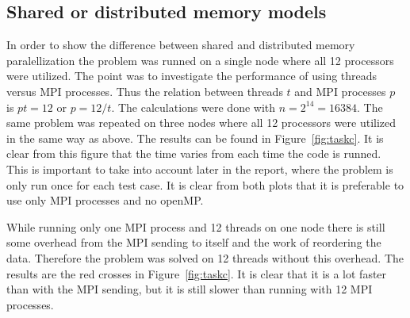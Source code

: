 \subsection{Shared or distributed memory models}
In order to show the difference between shared and distributed memory paralellization the problem was runned on a single node where all 12 processors were utilized. The point was to investigate the performance of using threads versus MPI processes. Thus the relation between threads $t$ and MPI processes $p$ is $p t = 12$ or $p = 12/t$. The calculations were done with $n = 2^{14} = 16384$. 
The same problem was repeated on three nodes where all 12 processors were utilized in the same way as above. The results can be found in Figure~\ref{fig:taskc}. It is clear from this figure that the time varies from each time the code is runned. This is important to take into account later in the report, where the problem is only run once for each test case. It is clear from both plots that it is preferable to use only MPI processes and no openMP. 

While running only one MPI process and 12 threads on one node there is still some overhead from the MPI sending to itself and the work of reordering the data. Therefore the problem was solved on 12 threads without this overhead. The results are the red crosses in Figure~\ref{fig:taskc}. It is clear that it is a lot faster than with the MPI sending, but it is still slower than running with 12 MPI processes. 

